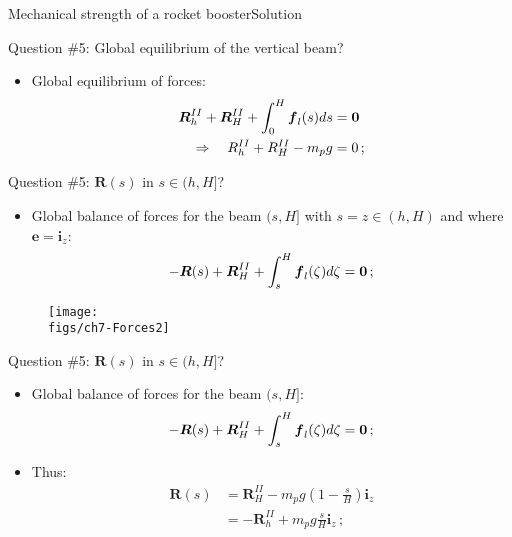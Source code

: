\documentclass{beamer}
\newcommand{\id}{d}
\newcommand{\imply}{\Rightarrow}
\newcommand{\zj}{z}
\newcommand{\ej}{e}
\renewcommand{\ij}{i}
\newcommand{\ev}{{\boldsymbol\ej}}
\newcommand{\iv}{{\boldsymbol\ij}}
\newcommand{\fj}{f}
\newcommand{\Rj}{R}
\newcommand{\fv}{{\boldsymbol\fj}}
\newcommand{\Rv}{{\boldsymbol\Rj}}
\newcommand{\Fresj}{R}
\newcommand{\Fres}{{\boldsymbol\Fresj}}
\newcommand{\bzero}{{\bf 0}}
\begin{document}
\begin{frame}{Mechanical strength of a rocket booster}{Solution}

\begin{overprint}

\vskip-20pt
\begin{exampleblock}{Question \#5: Global equilibrium of the vertical beam?}
\begin{itemize}
\item Global equilibrium of forces:
\begin{displaymath}
\begin{split}
\Rv_h^{II}+\Rv_H^{II}+\int_0^H\fv_l(s)\id s &=\bzero \\
\imply\quad\Rj_h^{II}+\Rj_H^{II}-m_pg &=0\,;
\end{split}
\end{displaymath}
\end{itemize}
\end{exampleblock}

\vskip-20pt
\begin{exampleblock}{Question \#5: $\Fres(s)$ in $s\in(h,H]$?}
\begin{itemize}
\item Global balance of forces for the beam $(s,H]$ with $s=\zj\in(h,H)$ and where $\ev=\iv_\zj$:
\begin{displaymath}
-\Fres(s)+\Rv_H^{II}+\int_s^H\fv_l(\zeta)\id\zeta=\bzero\,;
\end{displaymath}
\end{itemize}
\end{exampleblock}
\begin{figure}
\centering\texttt{[image: \\figs/ch7-Forces2]}
\end{figure}

\vskip-20pt
\begin{exampleblock}{Question \#5: $\Fres(s)$ in $s\in(h,H]$?}
\begin{itemize}
\item Global balance of forces for the beam $(s,H]$:
\begin{displaymath}
-\Fres(s)+\Rv_H^{II}+\int_s^H\fv_l(\zeta)\id\zeta=\bzero\,;
\end{displaymath}
\item Thus:
\begin{displaymath}
\begin{split}
\Fres(s) &=\Rv_H^{II}-m_pg\left(1-\frac{s}{H}\right)\iv_\zj \\
&=-\Rv_h^{II}+m_pg\frac{s}{H}\iv_\zj\,;
\end{split}
\end{displaymath}
\end{itemize}
\end{exampleblock}


\end{overprint}
\end{frame}
\end{document}
